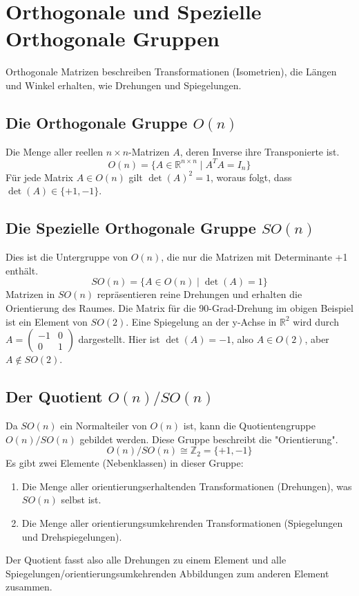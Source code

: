 \section{Orthogonale und Spezielle Orthogonale Gruppen}
Orthogonale Matrizen beschreiben Transformationen (Isometrien), die Längen und
Winkel erhalten, wie Drehungen und Spiegelungen.

\subsection{Die Orthogonale Gruppe \(O(n)\)}
Die Menge aller reellen \(n \times n\)-Matrizen \(A\), deren Inverse ihre
Transponierte ist.
\[
    O(n) = \{A \in \mathbb{R}^{n \times n} \mid A^T A = I_n\}
\]
Für jede Matrix \(A \in O(n)\) gilt \(\det(A)^2 = 1\), woraus folgt, dass
\(\det(A) \in \{+1, -1\}\).

\subsection{Die Spezielle Orthogonale Gruppe \(SO(n)\)}
Dies ist die Untergruppe von \(O(n)\), die nur die Matrizen mit Determinante +1
enthält.
\[
    SO(n) = \{A \in O(n) \mid \det(A) = 1\}
\]
Matrizen in $SO(n)$ repräsentieren reine Drehungen und erhalten die
Orientierung des Raumes. Die Matrix für die 90-Grad-Drehung im obigen Beispiel
ist ein Element von $SO(2)$. Eine Spiegelung an der y-Achse in \(\mathbb{R}^2\)
wird durch \(A = \begin{pmatrix} -1 & 0 \\ 0 & 1 \end{pmatrix}\) dargestellt. Hier ist \(\det(A) = -1\), also \(A \in O(2)\), aber \(A \notin SO(2)\).

\subsection{Der Quotient \(O(n)/SO(n)\)}
Da \(SO(n)\) ein Normalteiler von \(O(n)\) ist, kann die Quotientengruppe
\(O(n)/SO(n)\) gebildet werden. Diese Gruppe beschreibt die "Orientierung".
\[
    O(n)/SO(n) \cong \mathbb{Z}_2 = \{+1, -1\}
\]
Es gibt zwei Elemente (Nebenklassen) in dieser Gruppe:
\begin{enumerate}
    \item Die Menge aller orientierungserhaltenden Transformationen (Drehungen), was
          \(SO(n)\) selbst ist.
    \item Die Menge aller orientierungsumkehrenden Transformationen (Spiegelungen und
          Drehspiegelungen).
\end{enumerate}
Der Quotient fasst also alle Drehungen zu einem Element und alle Spiegelungen/orientierungsumkehrenden Abbildungen zum anderen Element zusammen.
